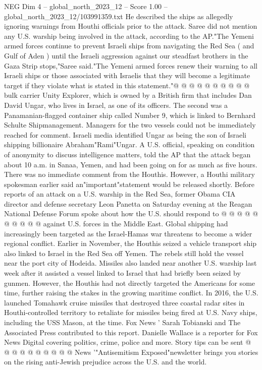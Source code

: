 \begin{textsample}{NEG Dim 4 – global\_north\_2023\_12 – Score 1.00 – global\_north\_2023\_12/103991359.txt}
He described the ships as allegedly ignoring warnings from Houthi officials prior to the attack.
Saree did not mention any U.S. warship being involved in the attack, according to the AP."The Yemeni armed forces continue to prevent Israeli ships from navigating the Red Sea ( and Gulf of Aden ) until the Israeli aggression against our steadfast brothers in the Gaza Strip stops,"Saree said."The Yemeni armed forces renew their warning to all Israeli ships or those associated with Israelis that they will become a legitimate target if they violate what is stated in this statement."@ @ @ @ @ @ @ @ @ @ bulk carrier Unity Explorer, which is owned by a British firm that includes Dan David Ungar, who lives in Israel, as one of its officers.
The second was a Panamanian-flagged container ship called Number 9, which is linked to Bernhard Schulte Shipmanagement.
Managers for the two vessels could not be immediately reached for comment.
Israeli media identified Ungar as being the son of Israeli shipping billionaire Abraham"Rami"Ungar.
A U.S. official, speaking on condition of anonymity to discuss intelligence matters, told the AP that the attack began about 10 a.m. in Sanaa, Yemen, and had been going on for as much as five hours.
There was no immediate comment from the Houthis.
However, a Houthi military spokesman earlier said an"important"statement would be released shortly.
Before reports of an attack on a U.S. warship in the Red Sea, former Obama CIA director and defense secretary Leon Panetta on Saturday evening at the Reagan National Defense Forum spoke about how the U.S. should respond to @ @ @ @ @ @ @ @ @ @ against U.S. forces in the Middle East.
Global shipping had increasingly been targeted as the Israel-Hamas war threatens to become a wider regional conflict.
Earlier in November, the Houthis seized a vehicle transport ship also linked to Israel in the Red Sea off Yemen.
The rebels still hold the vessel near the port city of Hodeida.
Missiles also landed near another U.S. warship last week after it assisted a vessel linked to Israel that had briefly been seized by gunmen.
However, the Houthis had not directly targeted the Americans for some time, further raising the stakes in the growing maritime conflict.
In 2016, the U.S. launched Tomahawk cruise missiles that destroyed three coastal radar sites in Houthi-controlled territory to retaliate for missiles being fired at U.S.
Navy ships, including the USS Mason, at the time.
Fox News ' Sarah Tobianski and The Associated Press contributed to this report.
Danielle Wallace is a reporter for Fox News Digital covering politics, crime, police and more.
Story tips can be sent @ @ @ @ @ @ @ @ @ @ News '"Antisemitism Exposed"newsletter brings you stories on the rising anti-Jewish prejudice across the U.S. and the world.

\end{textsample}
